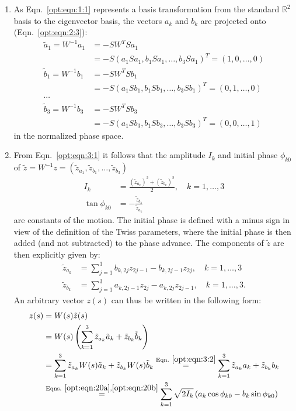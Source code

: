 \begin{enumerate}
\item As Eqn.~\ref{opt:eqn:1:1} represents a basis transformation from the standard $\mathbb{R}^2$ basis to the eigenvector basis, the vectors $a_k$ and $b_k$ are projected onto (Eqn.~\ref{opt:eqn:2:3}):
\begin{align}\label{opt:eqn:3:2}
\tilde a_1=W^{-1}a_1&=-SW^TSa_1\nonumber\\
&=-S(a_1Sa_1,b_1Sa_1,\ldots,b_3Sa_1)^T=(1,0,\ldots,0)\nonumber\\
\tilde b_1=W^{-1}b_1&=-SW^TSb_1\nonumber\\
&=-S(a_1Sb_1,b_1Sb_1,\ldots,b_3Sb_1)^T=(0,1,\ldots,0)\\
\cdots & \nonumber\\
\tilde b_3=W^{-1}b_3&=-SW^TSb_3\nonumber\\
&=-S(a_1Sb_3,b_1Sb_3,\ldots,b_3Sb_3)^T=(0,0,\ldots,1)\nonumber
\end{align}
in the normalized phase space.
\item From Eqn.~\ref{opt:eqn:3:1} it follows that the amplitude $I_k$ and initial phase $\phi_{k0}$ of $\tilde z=W^{-1}z=(\tilde z_{a_1},\tilde z_{b_1},\ldots,\tilde z_{b_3})$ 
\begin{align}
I_k&=\frac{(\tilde z_{a_k})^2 +(\tilde z_{b_k})^2}{2}, \quad k=1,\ldots,3\label{opt:eqn:20a}\\
\tan\phi_{k0}&=-\frac{\tilde z_{b_k}}{\tilde z_{a_k}} \label{opt:eqn:20b}
\end{align}
are constants of the motion.
The initial phase is defined with a minus sign in view of the definition of the Twiss parameters, where the initial phase is then added (and not subtracted) to the phase advance. The components of $\tilde z$ are then explicitly given by:
\begin{align}
\tilde z_{a_k}&= \sum_{j=1}^3  b_{k,2j} z_{2j-1}- b_{k,2j-1} z_{2j}, \quad k=1,\ldots,3\\
\tilde z_{b_k}&= \sum_{j=1}^3 a_{k,2j-1} z_{2j}- a_{k,2j} z_{2j-1}, \quad k=1,\ldots,3.
\end{align}
An arbitrary vector $z(s)$ can thus be written in the following form:
\begin{align}
 z(s)&=W(s)\tilde z(s)\nonumber\\
 &=W(s)\left(\sum_{k=1}^{3}\tilde z_{a_k}\tilde a_k + \tilde z_{b_k}\tilde b_k\right)\nonumber\\
 &=\sum_{k=1}^{3}\tilde z_{a_k}W(s)\tilde a_k + \tilde z_{b_k}W(s)\tilde b_k\overset{\rm Eqn.~\ref{opt:eqn:3:2}}{=}\sum_{k=1}^{3}\tilde z_{a_k}a_k + \tilde z_{b_k}b_k\nonumber\\
 &\overset{\rm Eqns.~\ref
 	{opt:eqn:20a},\ref{opt:eqn:20b}}=\sum_{k=1}^{3}\sqrt{2I_k}\left(a_k\cos{\phi_{k0}}-b_k\sin{\phi_{k0}}\right)
\end{align}
\end{enumerate}

